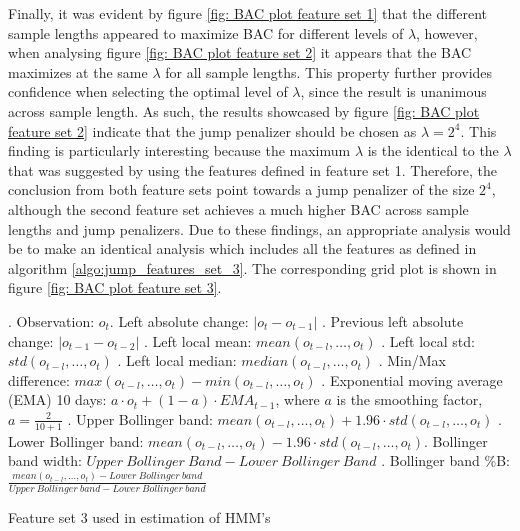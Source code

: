 Finally, it was evident by figure \ref{fig: BAC plot feature set 1} that the different sample lengths appeared to maximize BAC for different levels of $\lambda$, however, when analysing figure \ref{fig: BAC plot feature set 2} it appears that the BAC maximizes at the same $\lambda$ for all sample lengths. This property further provides confidence when selecting the optimal level of $\lambda$, since the result is unanimous across sample length. As such, the results showcased by figure \ref{fig: BAC plot feature set 2} indicate that the jump penalizer should be chosen as $\lambda = 2^4$. This finding is particularly interesting because the maximum $\lambda$ is the identical to the $\lambda$ that was suggested by using the features defined in feature set 1. Therefore, the conclusion from both feature sets point towards a jump penalizer of the size $2^4$, although the second feature set achieves a much higher BAC across sample lengths and jump penalizers. Due to these findings, an appropriate analysis would be to make an identical analysis which includes all the features as defined in algorithm \ref{algo:jump_features_set_3}. The corresponding grid plot is shown in figure \ref{fig: BAC plot feature set 3}.

\begin{algorithm}[H]
. Observation: $o_t$. Left absolute change: $|o_t-o_{t-1}|$ . Previous left absolute change: $|o_{t-1}-o_{t-2}|$ . Left local mean: $mean(o_{t-l},\ldots,o_{t})$ . Left local std: $std(o_{t-l},\ldots, o_{t})$ . Left local median: $median(o_{t-l},\ldots,o_{t})$ . Min/Max difference: $max(o_{t-l},\ldots,o_{t}) - min(o_{t-l},\ldots,o_{t})$ . Exponential moving average (EMA) 10 days: $a \cdot o_t + (1-a) \cdot EMA_{t-1}$, \quad where $a$ is the smoothing factor, $a = \frac{2}{10+1}$ . Upper Bollinger band: $mean(o_{t-l},\ldots,o_t) + 1.96 \cdot std(o_{t-l},\ldots,o_t)$ . Lower Bollinger band: $mean(o_{t-l},\ldots,o_t) - 1.96 \cdot std(o_{t-l},\ldots,o_t)$. Bollinger band width: $Upper\ Bollinger\ Band - Lower\  Bollinger\ Band$ . Bollinger band \%B: $\frac{mean(o_{t-l},\ldots,o_{t}) - Lower\ Bollinger\ band} {Upper\ Bollinger\ band - Lower\ Bollinger\ band}$  \;
\BlankLine
{}
\caption{Feature set 3 used in \jump estimation of HMM's}
\label{algo:jump_features_set_3}
\end{algorithm}


